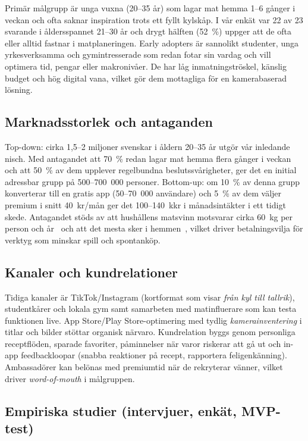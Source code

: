 \documentclass[a4paper,12pt]{article}
\begin{document}
Primär målgrupp är unga vuxna (20--35 år) som lagar mat hemma 1--6 gånger i veckan och ofta saknar inspiration trots ett fyllt kylskåp. I vår enkät var 22 av 23 svarande i åldersspannet 21--30 år och drygt hälften (52~\%) uppger att de ofta eller alltid fastnar i matplaneringen. Early adopters är sannolikt studenter, unga yrkesverksamma och gymintresserade som redan fotar sin vardag och vill optimera tid, pengar eller makronivåer. De har låg inmatningströskel, känslig budget och hög digital vana, vilket gör dem mottagliga för en kamerabaserad lösning.


\subsection{Marknadsstorlek och antaganden}

Top-down: cirka 1,5--2 miljoner svenskar i åldern 20--35 år utgör vår inledande nisch. Med antagandet att 70~\% redan lagar mat hemma flera gånger i veckan och att 50~\% av dem upplever regelbundna beslutssvårigheter, ger det en initial adressbar grupp på 500--700~000 personer. Bottom-up: om 10~\% av denna grupp konverterar till en gratis app (50--70~000 användare) och 5~\% av dem väljer premium i snitt 40~kr/mån ger det 100--140~kkr i månadsintäkter i ett tidigt skede. Antagandet stöds av att hushållens matsvinn motsvarar cirka 60~kg per person och år~\cite{naturvardsverket-matavfall} och att det mesta sker i hemmen~\cite{livsmedelsverket2023}, vilket driver betalningsvilja för verktyg som minskar spill och spontanköp.


\subsection{Kanaler och kundrelationer}

Tidiga kanaler är TikTok/Instagram (kortformat som visar \textit{från kyl till tallrik}), studentkårer och lokala gym samt samarbeten med matinfluerare som kan testa funktionen live. App Store/Play Store-optimering med tydlig \textit{kamerainventering} i titlar och bilder stöttar organisk närvaro. Kundrelation byggs genom personliga receptflöden, sparade favoriter, påminnelser när varor riskerar att gå ut och in-app feedbackloopar (snabba reaktioner på recept, rapportera feligenkänning). Ambassadörer kan belönas med premiumtid när de rekryterar vänner, vilket driver \textit{word-of-mouth} i målgruppen.


\subsection{Empiriska studier (intervjuer, enkät, MVP-test)}
\end{document}
